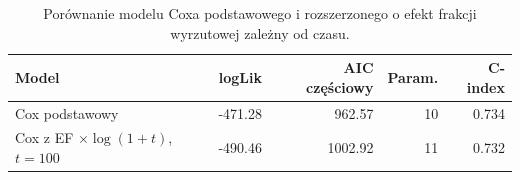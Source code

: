 \begin{table}[htbp]
\centering
\caption{Porównanie modelu Coxa podstawowego i rozszerzonego o efekt frakcji wyrzutowej zależny od czasu.}
\label{tab:cox-time}
\small
\setlength{\tabcolsep}{2.4pt}
\begin{tabular*}{.98\linewidth}{@{\extracolsep{\fill}}lrrrr}
\toprule
Model & logLik & AIC częściowy & Param. & C-index \\
\midrule
Cox podstawowy & -471.28 & 962.57 & 10 & 0.734 \\
Cox z EF $\times \log(1+t)$, $t=100$ & -490.46 & 1002.92 & 11 & 0.732 \\
\bottomrule
\end{tabular*}
\end{table}